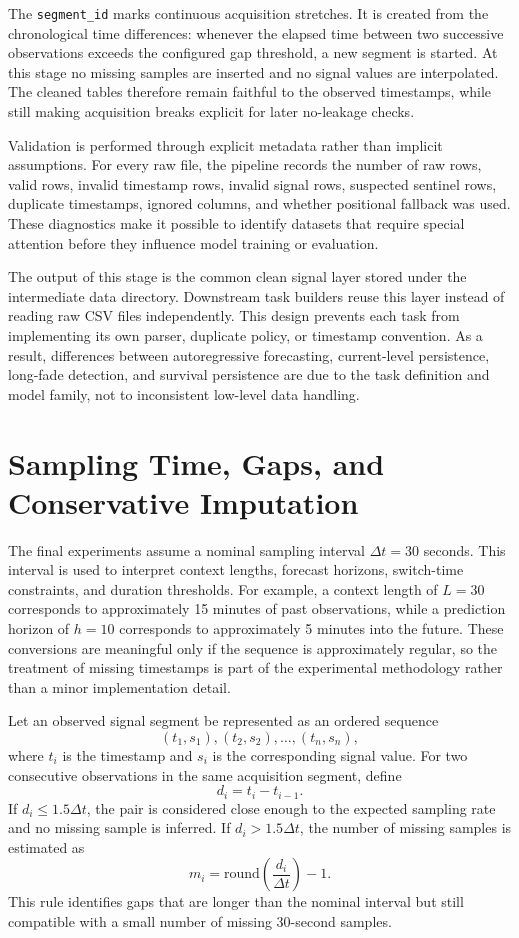The \texttt{segment\_id} marks continuous acquisition stretches. It is created
from the chronological time differences: whenever the elapsed time between two
successive observations exceeds the configured gap threshold, a new segment is
started. At this stage no missing samples are inserted and no signal values are
interpolated. The cleaned tables therefore remain faithful to the observed
timestamps, while still making acquisition breaks explicit for later
no-leakage checks.

Validation is performed through explicit metadata rather than implicit
assumptions. For every raw file, the pipeline records the number of raw rows,
valid rows, invalid timestamp rows, invalid signal rows, suspected sentinel
rows, duplicate timestamps, ignored columns, and whether positional fallback
was used. These diagnostics make it possible to identify datasets that require
special attention before they influence model training or evaluation.

The output of this stage is the common clean signal layer stored under the
intermediate data directory. Downstream task builders reuse this layer instead
of reading raw CSV files independently. This design prevents each task from
implementing its own parser, duplicate policy, or timestamp convention. As a
result, differences between autoregressive forecasting, current-level
persistence, long-fade detection, and survival persistence are due to the task
definition and model family, not to inconsistent low-level data handling.

\section{Sampling Time, Gaps, and Conservative Imputation}

The final experiments assume a nominal sampling interval
\(\Delta t = 30\) seconds. This interval is used to interpret context lengths,
forecast horizons, switch-time constraints, and duration thresholds. For
example, a context length of \(L=30\) corresponds to approximately 15 minutes
of past observations, while a prediction horizon of \(h=10\) corresponds to
approximately 5 minutes into the future. These conversions are meaningful only
if the sequence is approximately regular, so the treatment of missing
timestamps is part of the experimental methodology rather than a minor
implementation detail.

Let an observed signal segment be represented as an ordered sequence
\[
  (t_1, s_1), (t_2, s_2), \ldots, (t_n, s_n),
\]
where \(t_i\) is the timestamp and \(s_i\) is the corresponding signal value.
For two consecutive observations in the same acquisition segment, define
\[
  d_i = t_i - t_{i-1}.
\]
If \(d_i \leq 1.5\Delta t\), the pair is considered close enough to the
expected sampling rate and no missing sample is inferred. If \(d_i >
1.5\Delta t\), the number of missing samples is estimated as
\[
  m_i = \mathrm{round}\left(\frac{d_i}{\Delta t}\right) - 1.
\]
This rule identifies gaps that are longer than the nominal interval but still
compatible with a small number of missing 30-second samples.

